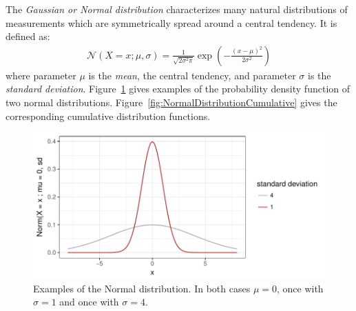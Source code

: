 \documentclass[nobib,nofonts]{tufte-handout}
\renewcommand{\markdef}[1]{\emph{#1}}
\begin{document}
\begin{example}
  The \markdef{Gaussian or Normal distribution} characterizes many natural distributions of
  measurements which are symmetrically spread around a central tendency. It is defined as:
  \begin{align*}
    \mathcal{N}(X = x ; \mu, \sigma) = \frac{1}{\sqrt{2 \sigma^2 \pi}} \exp \left ( -
      \frac{(x-\mu)^2}{2 \sigma^2} \right)
  \end{align*}
  where parameter $\mu$ is the \emph{mean}, the central tendency, and parameter $\sigma$ is the
  \emph{standard deviation}. Figure~\ref{fig:NormalDistribution} gives examples of the
  probability density function of two normal
  distributions. Figure~\ref{fig:NormalDistributionCumulative} gives the corresponding
  cumulative distribution functions.

\begin{figure}
  \centering
  \includegraphics[width=\textwidth]{00-pics/05_01_normal-distribution.pdf}
  \caption{Examples of the Normal distribution. In both cases $\mu = 0$, once with $\sigma = 1$
    and once with $\sigma = 4$.}
  \label{fig:NormalDistribution}
\end{figure}


\end{example}
\end{document}
